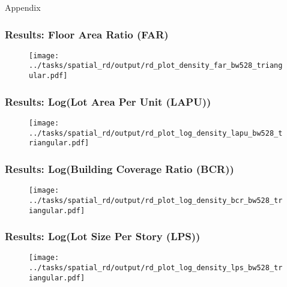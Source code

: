\begin{frame}[plain]
  \begin{center}{\LARGE Appendix}\end{center}
  \end{frame}
\begin{frame}[t,label=levels]
  \frametitle{Results: Floor Area Ratio (FAR)} 
  \begin{figure}
      \centering
      \texttt{[image: ../tasks/spatial\_rd/output/rd\_plot\_density\_far\_bw528\_triangular.pdf]}
      \label{fig:spatial_rd_lapu}
  \end{figure}
  \vfill\hfill \hyperlink{far-main}{}
\end{frame}

\begin{frame}[t,label=lapu]
    \frametitle{Results: Log(Lot Area Per Unit (LAPU))} 
    \begin{figure}
        \centering
        \texttt{[image: ../tasks/spatial\_rd/output/rd\_plot\_log\_density\_lapu\_bw528\_triangular.pdf]}
        \label{fig:spatial_rd_lapu}
    \end{figure}
    \vfill\hfill \hyperlink{far-main}{}
  \end{frame}

  \begin{frame}[t,label=bcr]
    \frametitle{Results: Log(Building Coverage Ratio (BCR))} 
    \begin{figure}
        \centering
        \texttt{[image: ../tasks/spatial\_rd/output/rd\_plot\_log\_density\_bcr\_bw528\_triangular.pdf]}
        \label{fig:spatial_rd_lapu}
    \end{figure}
    \vfill\hfill \hyperlink{far-main}{}
  \end{frame}

  \begin{frame}[t,label=lps]
    \frametitle{Results: Log(Lot Size Per Story (LPS))} 
    \begin{figure}
        \centering
        \texttt{[image: ../tasks/spatial\_rd/output/rd\_plot\_log\_density\_lps\_bw528\_triangular.pdf]}
        \label{fig:spatial_rd_lapu}
    \end{figure}
    \vfill\hfill \hyperlink{far-main}{}
  \end{frame}



